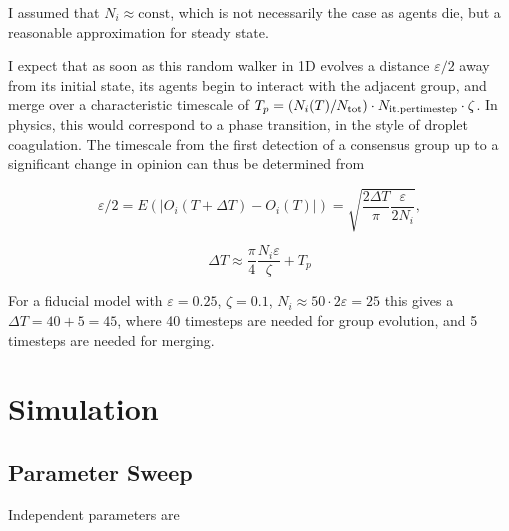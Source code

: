 \documentclass[useAMS,usenatbib]{templates/mn2e}
\begin{document}
I assumed that $N_i\approx \text{const}$, which is not necessarily the
case as agents die, but a reasonable approximation for steady state.

I expect that as soon as this random walker in 1D evolves a distance
$\varepsilon/2$ away from its initial state, its agents begin to
interact with the adjacent group, and merge over a characteristic timescale of
$T_p = (N_i(T)/N_{\rm tot})\cdot N_{\rm it. per timestep}\cdot \zeta$. In physics, this would correspond to
a phase transition, in the style of droplet coagulation. The timescale from the first detection of a
consensus group up to a significant change in opinion can thus be
determined from

\begin{equation}
    \varepsilon/2 = E(|O_i(T+\Delta T)-O_i(T)|) =  \sqrt{\frac{2\Delta T}{\pi}\frac{\varepsilon}{2 N_i}},
\end{equation}

\begin{equation}
    \Delta T \approx \frac{\pi}{4}\frac{N_i\varepsilon}{\zeta} + T_p
\end{equation}

For a fiducial model with $\varepsilon=0.25$, $\zeta=0.1$, $N_i\approx 50\cdot
2\varepsilon = 25$ this gives a $\Delta T=40+5=45$, where 40 timesteps
are needed for group evolution, and 5 timesteps are
needed for merging.

\section{Simulation}
\label{sec:sim}

\subsection{Parameter Sweep}
\label{sec:parameter_sweep}

Independent parameters are
\end{document}
